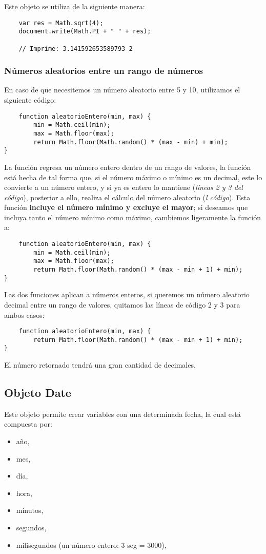 Este objeto se utiliza de la siguiente manera:
\begin{lstlisting}
    var res = Math.sqrt(4);
    document.write(Math.PI + " " + res);

    // Imprime: 3.141592653589793 2
\end{lstlisting}


\subsubsection{Números aleatorios entre un rango de números}
\hspace{0.55cm}En caso de que necesitemos un número aleatorio entre 5 y 10, utilizamos el siguiente código:
\begin{lstlisting}
    function aleatorioEntero(min, max) {
        min = Math.ceil(min);
        max = Math.floor(max);
        return Math.floor(Math.random() * (max - min) + min);
}
\end{lstlisting}

La función regresa un número entero dentro de un rango de valores, la función está hecha de tal forma que, si el número máximo o mínimo es un decimal, este lo convierte a un número entero, y si ya es entero lo mantiene (\textit{líneas 2 y 3 del código}), posterior a ello, realiza el cálculo del número aleatorio (\textit{l código}). Esta función \textbf{incluye el número mínimo y excluye el mayor}; si deseamos que incluya tanto el número mínimo como máximo, cambiemos ligeramente la función a:
\begin{lstlisting}
    function aleatorioEntero(min, max) {
        min = Math.ceil(min);
        max = Math.floor(max);
        return Math.floor(Math.random() * (max - min + 1) + min);
}
\end{lstlisting}

Las dos funciones aplican a números enteros, si queremos un número aleatorio decimal entre un rango de valores, quitamos las líneas de código 2 y 3 para ambos casos:

\begin{lstlisting}
    function aleatorioEntero(min, max) {
        return Math.floor(Math.random() * (max - min + 1) + min);
}
\end{lstlisting}

El número retornado tendrá una gran cantidad de decimales.


\subsection{Objeto Date}
\hspace{0.55cm}Este objeto permite crear variables con una determinada fecha, la cual está compuesta por:
\begin{itemize}
    \item año,
    \item mes,
    \item día,
    \item hora,
    \item minutos,
    \item segundos,
    \item milisegundos (un número entero: 3 seg = 3000),
\end{itemize}

